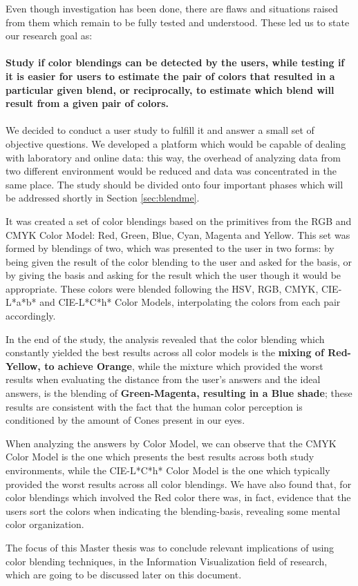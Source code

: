 %
Even though investigation has been done, there are flaws and situations raised from them which remain to be fully
tested and understood. These led us to state our research goal as: \\ \\
%
\textbf{Study if color blendings can be detected by the users, while testing if it is easier for
users to estimate the pair of colors that resulted in a particular given blend, or reciprocally, to estimate
which blend will result from a given pair of colors.} \\ \\
%
We decided to conduct a user study to fulfill it and answer a small set of objective
questions. We developed a platform which would be capable of dealing with laboratory and online data: this way,
the overhead of analyzing data from two different environment would be reduced and data was concentrated in the same
place. The study should be divided onto four important phases which will be addressed shortly in Section \ref{sec:blendme}. \par
%
It was created a set of color blendings based on the primitives from the RGB and CMYK Color Model: Red, Green, Blue,
Cyan, Magenta and Yellow. This set was formed by blendings of two, which was presented to the user in two forms:
by being given the result of the color blending to the user and asked for the basis, or by giving the basis and asking
for the result which the user though it would be appropriate. These colors were blended following the HSV, RGB, CMYK,
CIE-L*a*b* and CIE-L*C*h* Color Models, interpolating the colors from each pair accordingly. \par
%
In the end of the study, the analysis revealed that the color blending which
constantly yielded the best results across all color models is the \textbf{mixing of Red-Yellow, to achieve Orange}, while
the mixture which provided the worst results when evaluating the distance from the user’s answers and the ideal answers,
is the blending of \textbf{Green-Magenta, resulting in a Blue shade}; these results are consistent with the fact that
the human color perception is conditioned by the amount of Cones present in our eyes. \par
%
When analyzing the answers by Color Model, we can observe that the CMYK Color Model is the one which presents the best
results across both study environments, while the CIE-L*C*h* Color Model is the one which typically provided the worst
results across all color blendings. We have also found that, for color blendings which involved the Red color there was,
in fact, evidence that the users sort the colors when indicating the blending-basis, revealing some mental color organization. \par
%
The focus of this Master thesis was to conclude relevant implications of using color blending techniques, in the Information
Visualization field of research, which are going to be discussed later on this document.
%
